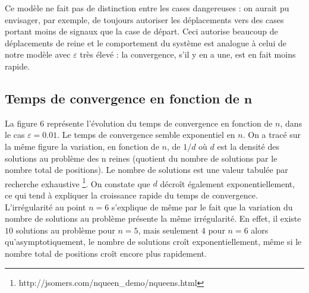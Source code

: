 \documentclass[11pt, openany]{article}
\begin{document}

Ce modèle ne fait pas de distinction entre les cases dangereuses : on aurait pu envisager, par exemple, de toujours autoriser les déplacements vers des cases portant moins de signaux que la case de départ. Ceci autorise beaucoup de déplacements de reine et le comportement du système est analogue à celui de notre modèle avec $\varepsilon$ très élevé : la convergence, s'il y en a une, est en fait moins rapide. 

\subsection*{Temps de convergence en fonction de $\boldsymbol n$}

  

La figure $6$ représente l'évolution du temps de convergence en fonction de $n$, dans le cas $\varepsilon=0.01$. Le temps de convergence semble exponentiel en $n$. On a tracé sur la même figure la variation, en fonction de $n$, de $1/d$ où $d$ est la densité des solutions au problème des n reines (quotient du nombre de solutions par le nombre total de positions). Le nombre de solutions est une valeur tabulée par recherche exhaustive \footnote{http://jsomers.com/nqueen\_demo/nqueens.html}. On constate que $d$ décroît également exponentiellement, ce qui tend à expliquer la croissance rapide du temps de convergence. L'irrégularité au point $n=6$ s'explique de même par le fait que la variation du nombre de solutions au problème présente la même irrégularité. En effet, il existe $10$ solutions au problème pour $n=5$, mais seulement $4$ pour $n=6$ alors qu'asymptotiquement, le nombre de solutions croît exponentiellement, même si le nombre total de positions croît encore plus rapidement.
\end{document}
